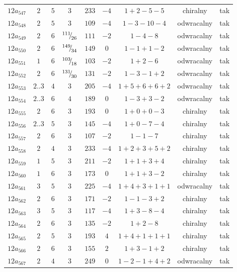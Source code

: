 \begin{longtable}{ccccccccc}
$12a_{547}$ & $2$ & $5$ & $3$ & $233$ & $-4$ & $1+2-5-5$ & chiralny & tak \\
$12a_{548}$ & $2$ & $5$ & $3$ & $109$ & $-4$ & $1-3-10-4$ & odwracalny & tak \\
$12a_{549}$ & $2$ & $6$ & ${}^{111}{\mskip -5mu/\mskip -3mu}_{26}$ & $111$ & $-2$ & $1-4-8$ & odwracalny & tak \\
$12a_{550}$ & $2$ & $6$ & ${}^{149}{\mskip -5mu/\mskip -3mu}_{34}$ & $149$ & $0$ & $1-1+1-2$ & odwracalny & tak \\
$12a_{551}$ & $1$ & $6$ & ${}^{103}{\mskip -5mu/\mskip -3mu}_{18}$ & $103$ & $-2$ & $1+2-6$ & odwracalny & tak \\
$12a_{552}$ & $2$ & $6$ & ${}^{131}{\mskip -5mu/\mskip -3mu}_{30}$ & $131$ & $-2$ & $1-3-1+2$ & odwracalny & tak \\
$12a_{553}$ & $2..3$ & $4$ & $3$ & $205$ & $-4$ & $1+5+6+6+2$ & odwracalny & tak \\
$12a_{554}$ & $2..3$ & $6$ & $4$ & $189$ & $0$ & $1-3+3-2$ & odwracalny & tak \\
$12a_{555}$ & $2$ & $6$ & $3$ & $193$ & $0$ & $1+0+0-3$ & chiralny & tak \\
$12a_{556}$ & $2..3$ & $5$ & $3$ & $145$ & $-4$ & $1+0-7-4$ & chiralny & tak \\
$12a_{557}$ & $2$ & $6$ & $3$ & $107$ & $-2$ & $1-1-7$ & chiralny & tak \\
$12a_{558}$ & $2$ & $4$ & $3$ & $233$ & $-4$ & $1+2+3+5+2$ & chiralny & tak \\
$12a_{559}$ & $1$ & $5$ & $3$ & $211$ & $-2$ & $1+1+3+4$ & chiralny & tak \\
$12a_{560}$ & $1$ & $6$ & $3$ & $173$ & $0$ & $1+1+3-2$ & chiralny & tak \\
$12a_{561}$ & $3$ & $5$ & $3$ & $225$ & $-4$ & $1+4+3+1+1$ & odwracalny & tak \\
$12a_{562}$ & $2$ & $6$ & $3$ & $171$ & $-2$ & $1-1-3+2$ & chiralny & tak \\
$12a_{563}$ & $3$ & $5$ & $3$ & $117$ & $-4$ & $1+3-8-4$ & chiralny & tak \\
$12a_{564}$ & $2$ & $6$ & $3$ & $135$ & $-2$ & $1+2-8$ & chiralny & tak \\
$12a_{565}$ & $2$ & $5$ & $3$ & $193$ & $4$ & $1+4+1+1+1$ & chiralny & tak \\
$12a_{566}$ & $2$ & $6$ & $3$ & $155$ & $2$ & $1+3-1+2$ & chiralny & tak \\
$12a_{567}$ & $2$ & $4$ & $3$ & $249$ & $0$ & $1-2-1+4+2$ & odwracalny & tak \\

\end{longtable}
